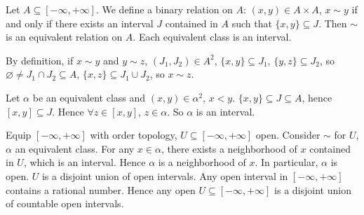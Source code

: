 \begin{propositionenv}
    Let $A\subseteq [-\infty,+\infty]$. We define a binary relation on $A$: $(x,y)\in A\times A$, $x\sim y$ if and only if there exists an interval $J$ contained in $A$ such that $\{x,y\}\subseteq J$. Then $\sim $ is an equivalent relation on $A$. Each equivalent class is an interval.
\end{propositionenv}
\begin{proofenv}
    By definition, if $x\sim y$ and $y\sim z$, $(J_1,J_2)\in A^2$, $\{x,y\}\subseteq J_1$, $\{y,z\}\subseteq J_2$, so $\varnothing\neq J_1\cap J_2\subseteq A$, $\{x,z\}\subseteq J_1\cup J_2$, so $x\sim z$.

    Let $\alpha$ be an equivalent class and $(x,y)\in \alpha^2$, $x<y$. $\{x,y\}\subseteq J\subseteq A$, hence $[x,y]\subseteq J$. Hence $\forall z\in [x,y]$, $z\in \alpha$. So $\alpha$ is an interval.
\end{proofenv}
\begin{remark}\label{10.7.6}
    Equip $[-\infty,+\infty]$ with order topology, $U\subseteq [-\infty,+\infty]$ open. Consider $\sim$ for $U$, $\alpha$ an equivalent class. For any $x\in \alpha$, there exists a neighborhood of $x$ contained in $U$, which is an interval.
    Hence $\alpha$ is a neighborhood of $x$. In particular, $\alpha$ is open. $U$ is a disjoint union of open intervals. Any open interval in $[-\infty,+\infty]$ contains a rational number. Hence any open $U\subseteq[-\infty,+\infty]$ is a disjoint union of countable open intervals.
\end{remark}
